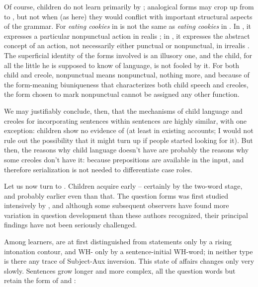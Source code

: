 Of course, children do not learn primarily by ; analogical
forms may crop up from  to , but not when (as here) they would conflict with important structural aspects of the grammar. For \textit{eating cookies} in  is not the same as \textit{eating cookies} in . In , it expresses a particular nonpunctual action in realis ; in , it expresses the abstract concept of an action, not necessarily either punctual or nonpunctual, in irrealis . The superficial identity of the forms involved is an illusory one, and the child, for all the little he is supposed to know of language, is not fooled by it. For both child and creole, nonpunctual means nonpunctual, nothing more, and because of the form-meaning biuniqueness that characterizes both child speech and creoles, the form chosen to mark nonpunctual cannot be assigned any other function.

We may justifiably conclude, then, that the mechanisms of child language and creoles for incorporating sentences within sentences are highly similar, with one exception: children show no evidence of  (at least in existing accounts; I would not rule out the possibility that it might turn up if people started looking for it). But then, the reasons why child language doesn't have  are probably the reasons why some creoles don't have it: because prepositions are available in the input, and therefore serialization is not needed to differentiate case roles.

Let us now turn to . Children acquire  early -- certainly by the two-word stage, and probably earlier even than that. The  question forms was first studied intensively by \citet{KlimaEtAl1966}, and although some subsequent observers have found more variation in question development than these authors recognized, their principal findings have not been seriously challenged.

Among  learners,   are at first distinguished from statements only by a rising intonation contour, and WH- only by a sentence-initial WH-word; in neither type is there any trace of Subject-Aux inversion. This state of affairs changes only very slowly. Sentences grow longer and more complex, all the question words but   retain the form of  and :

